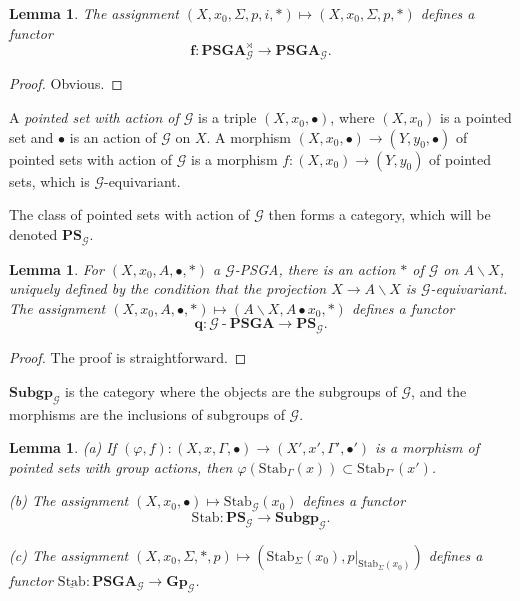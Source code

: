 \documentclass[10pt]{amsart}
\newtheorem{lem}[thm]{Lemma}
\numberwithin{equation}{subsection}
\begin{document}
\begin{lem}
The assignment $(X,x_0,\Sigma,p,i,*)\mapsto (X,x_0,\Sigma,p,*)$ defines a
functor 
$$
\mathbf f :\mathbf{PSGA}_{\mathcal G}^\rtimes\to\mathbf{PSGA}_{\mathcal G}.
$$ 
\end{lem}

\begin{proof}
    Obvious. 
\end{proof}

\begin{defn}
    A {\it pointed set with action of $\mathcal G$} is a triple $(X,x_0,\bullet)$, where $(X,x_0)$ is a pointed set and 
    $\bullet$ is an action of $\mathcal G$ on $X$. A morphism $(X,x_0,\bullet)\to(Y,y_0,\bullet)$ of pointed sets with action of $\mathcal G$
     is a morphism $f:(X,x_0)\to(Y,y_0)$ of pointed sets, which is $\mathcal G$-equivariant.  
\end{defn}

The class of pointed sets with action of $\mathcal G$ then forms a category, which will be denoted $\mathbf{PS}_{\mathcal G}$. 

\begin{lem}\label{lem:foncteur:q}
For $(X,x_0,A,\bullet,*)$ a $\mathcal G$-PSGA, there is an action $*$ of $\mathcal G$ on $A\backslash X$, 
uniquely defined by the condition that the projection $X\to A\backslash X$ is 
$\mathcal G$-equivariant. The assignment $(X,x_0,A,\bullet,*)\mapsto (A\backslash X,A\bullet x_0,*)$ 
defines a functor $$\mathbf q : \mathcal G\operatorname{-}\mathbf{PSGA}\to\mathbf{PS}_{\mathcal G}.$$ 
\end{lem}

\begin{proof}
The proof is straightforward.
\end{proof}

\begin{defn}
$\mathbf{Subgp}_{\mathcal G}$ is the category where the objects are the subgroups of $\mathcal G$, and the morphisms are the inclusions of 
subgroups of $\mathcal G$. 
\end{defn}

\begin{lem}\label{lem:def:stab:ulstab}\label{BASIC}
(a) If $(\varphi,f) : (X,x,\Gamma,\bullet)\to(X',x',\Gamma',\bullet')$ is a morphism of pointed
sets with group actions, then $\varphi(\mathrm{Stab}_\Gamma(x))\subset \mathrm{Stab}_{\Gamma'}(x')$.

(b) The assignment $(X,x_0,\bullet)\mapsto \mathrm{Stab}_{\mathcal G}(x_0)$ 
defines a functor $$\mathrm{Stab} : \mathbf{PS}_{\mathcal G}\to\mathbf{Subgp}_{\mathcal G}.$$ 

(c)    The assignment $(X,x_0,\Sigma,*,p)\mapsto (\mathrm{Stab}_\Sigma(x_0),p|_{\mathrm{Stab}_\Sigma(x_0)})$ defines a 
functor $\underline{\mathrm{Stab}} : \mathbf{PSGA}_{\mathcal G}\to
\mathbf{Gp}_{\mathcal G}$. 
\end{lem}
\end{document}
